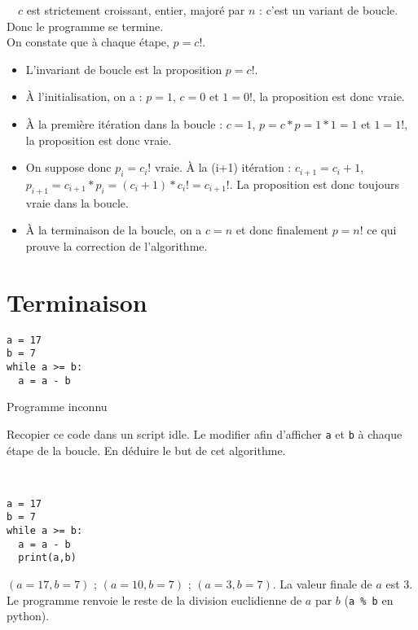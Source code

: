 \begin{solution}~\ 
$c$ est strictement croissant, entier, majoré par $n$ : c'est un variant de boucle. Donc le programme se termine.\\
On constate que à chaque étape, $p=c!$.
\begin{itemize}
\item L'invariant de boucle est la proposition $p=c!$.

\item À l'initialisation, on a : $p=1$, $c=0$ et $1=0!$, la proposition est donc vraie.

\item À la première itération dans la boucle : $c=1$, $p=c*p=1*1=1$ et $1=1!$, la proposition est donc vraie.

\item On suppose donc $p_i=c_i!$ vraie. À la (i+1) itération : $c_{i+1}=c_i+1$, $p_{i+1} = c_{i+1}*p_i=(c_i+1)*c_i!=c_{i+1}!$. La proposition est donc toujours vraie dans la boucle.

\item À la terminaison de la boucle, on a $c=n$ et donc finalement $p=n!$ ce qui prouve la correction de l'algorithme.
\end{itemize}
\end{solution}

\section{Terminaison}

\begin{listing}[!h]
\begin{verbatim}
a = 17
b = 7
while a >= b:
  a = a - b
\end{verbatim}
\caption{Programme inconnu}
\label{prog:programmeresteeuclidien}
\end{listing}

\begin{exercice}
Recopier ce code dans un script idle. Le modifier afin d'afficher \verb?a? et  \verb?b? à chaque étape de la boucle. En déduire le but de cet algorithme.
\end{exercice}

\begin{solution}~\ 
\begin{verbatim}
a = 17
b = 7
while a >= b:
  a = a - b
  print(a,b)
\end{verbatim}
$(a=17,b=7)$ ; $(a=10,b=7)$ ; $(a=3,b=7)$. La valeur finale de $a$ est 3. Le programme renvoie le reste de la division euclidienne de $a$ par $b$ (\texttt{a \% b} en python).
\end{solution}

